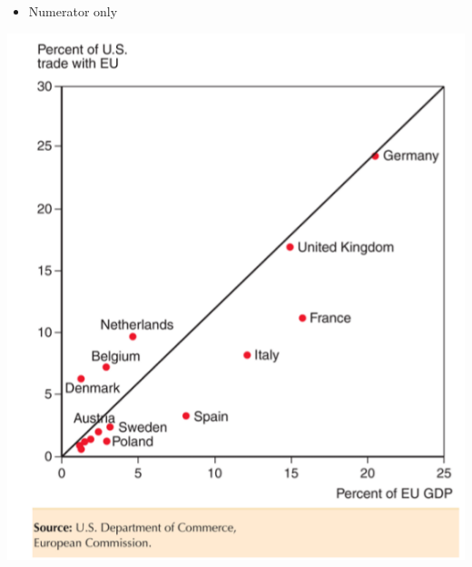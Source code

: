 \documentclass[ignorenonframetext,]{beamer}
\begin{document}
\begin{frame}
   
    \begin{itemize}
        \item Numerator only
    \end{itemize}
    \includegraphics[scale=0.40]{gravity_numerator_fit.png}

\end{frame}
\end{document}

